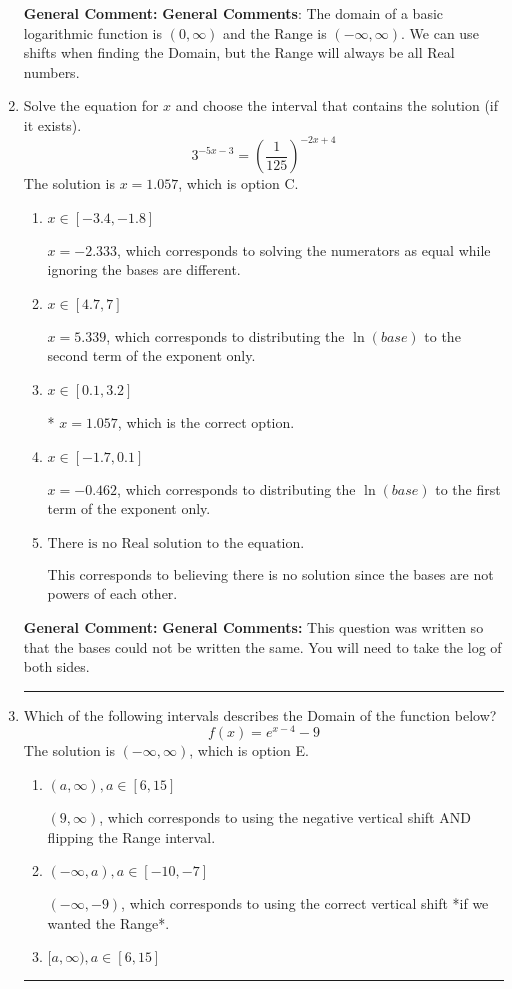 \documentclass{extbook}[14pt]
\newcommand{\litem}[1]{\item #1

\rule{\textwidth}{0.4pt}}
\begin{document}
\begin{enumerate}
{\textbf{General Comment:} \textbf{General Comments}: The domain of a basic logarithmic function is $(0, \infty)$ and the Range is $(-\infty, \infty)$. We can use shifts when finding the Domain, but the Range will always be all Real numbers.
}
\litem{
Solve the equation for $x$ and choose the interval that contains the solution (if it exists).
\[ 3^{-5x-3} = \left(\frac{1}{125}\right)^{-2x+4} \]The solution is \( x = 1.057 \), which is option C.\begin{enumerate}[label=\Alph*.]
\item \( x \in [-3.4, -1.8] \)

$x = -2.333$, which corresponds to solving the numerators as equal while ignoring the bases are different.
\item \( x \in [4.7, 7] \)

$x = 5.339$, which corresponds to distributing the $\ln(base)$ to the second term of the exponent only.
\item \( x \in [0.1, 3.2] \)

* $x = 1.057$, which is the correct option.
\item \( x \in [-1.7, 0.1] \)

$x = -0.462$, which corresponds to distributing the $\ln(base)$ to the first term of the exponent only.
\item \( \text{There is no Real solution to the equation.} \)

This corresponds to believing there is no solution since the bases are not powers of each other.
\end{enumerate}

\textbf{General Comment:} \textbf{General Comments:} This question was written so that the bases could not be written the same. You will need to take the log of both sides.
}
\litem{
Which of the following intervals describes the Domain of the function below?
\[ f(x) = e^{x-4}-9 \]The solution is \( (-\infty, \infty) \), which is option E.\begin{enumerate}[label=\Alph*.]
\item \( (a, \infty), a \in [6, 15] \)

$(9, \infty)$, which corresponds to using the negative vertical shift AND flipping the Range interval.
\item \( (-\infty, a), a \in [-10, -7] \)

$(-\infty, -9)$, which corresponds to using the correct vertical shift *if we wanted the Range*.
\item \( [a, \infty), a \in [6, 15] \)


\end{enumerate}}
\end{enumerate}
\end{document}
